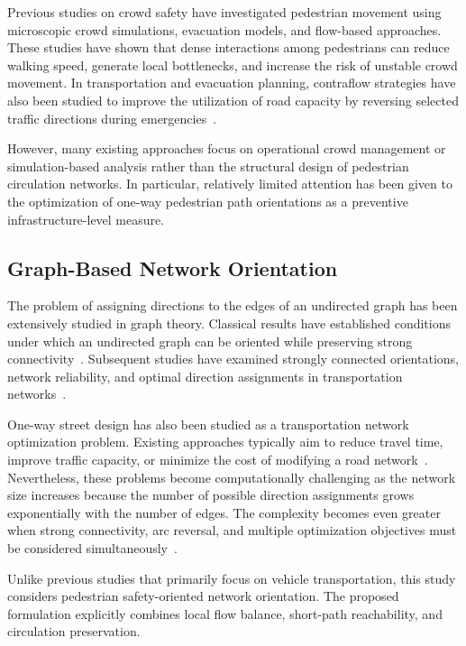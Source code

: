 \documentclass[twocolumn,a4paper]{article} %
\begin{document}
Previous studies on crowd safety have investigated pedestrian movement using microscopic crowd simulations, evacuation models, and flow-based approaches. 
These studies have shown that dense interactions among pedestrians can reduce walking speed, generate local bottlenecks, and increase the risk of unstable crowd movement. 
In transportation and evacuation planning, contraflow strategies have also been studied to improve the utilization of road capacity by reversing selected traffic directions during emergencies~\cite{kim2008contraflow, aksu2014mathematical}. 

However, many existing approaches focus on operational crowd management or simulation-based analysis rather than the structural design of pedestrian circulation networks. 
In particular, relatively limited attention has been given to the optimization of one-way pedestrian path orientations as a preventive infrastructure-level measure.

\subsection{Graph-Based Network Orientation}
\label{subsec:related_graph}

The problem of assigning directions to the edges of an undirected graph has been extensively studied in graph theory. 
Classical results have established conditions under which an undirected graph can be oriented while preserving strong connectivity~\cite{robbins1939theorem}. 
Subsequent studies have examined strongly connected orientations, network reliability, and optimal direction assignments in transportation networks~\cite{chung1985strongly, roberts1988optimal, roberts1994optimal}. 

One-way street design has also been studied as a transportation network optimization problem. 
Existing approaches typically aim to reduce travel time, improve traffic capacity, or minimize the cost of modifying a road network~\cite{drezner1997selecting, huang2020bi, huang2020model}. 
Nevertheless, these problems become computationally challenging as the network size increases because the number of possible direction assignments grows exponentially with the number of edges. 
The complexity becomes even greater when strong connectivity, arc reversal, and multiple optimization objectives must be considered simultaneously~\cite{burkard1999minimum, bangjensen2023complexity}. 

Unlike previous studies that primarily focus on vehicle transportation, this study considers pedestrian safety-oriented network orientation. 
The proposed formulation explicitly combines local flow balance, short-path reachability, and circulation preservation.
\end{document}

